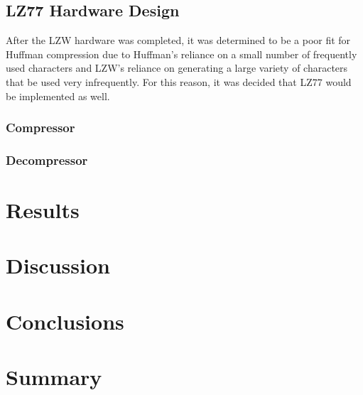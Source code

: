 \documentclass[doublespace,draft,nopageskip]{VTthesis} %
\begin{document}
\section{LZ77 Hardware Design}\label{se:lz77_hardware_design}
After the LZW hardware was completed, it was determined to be a poor fit for Huffman compression due to Huffman's reliance on a small number of frequently used characters and LZW's reliance on generating a large variety of characters that be used very infrequently. For this reason, it was decided that LZ77 would be implemented as well. 

\subsection{Compressor}\label{ss:lz77_hardware_compressor}
\subsection{Decompressor}\label{ss:lz78_hardware_decompressor}

\chapter{Results} \label{ch:results}
\chapter{Discussion} \label{ch:discussion}
\chapter{Conclusions} \label{ch:conclusions}
\chapter{Summary} \label{ch:summary}

	
	   

	\appendix
\end{document}

